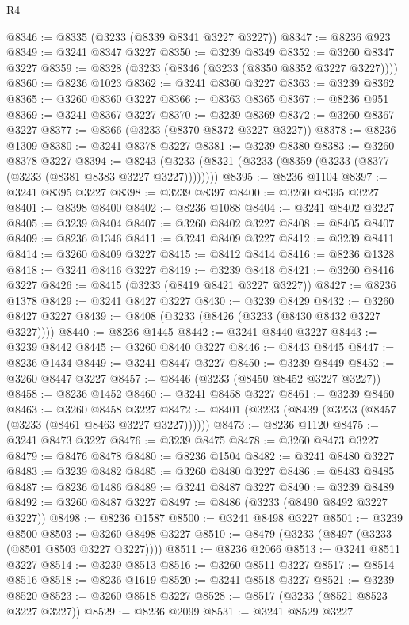 \begin{lexlean}{R4}
\begin{coremodule}
@8346 := @8335 (@3233 (@8339 @8341 @3227 @3227))
@8347 := @8236 @923
@8349 := @3241 @8347 @3227
@8350 := @3239 @8349
@8352 := @3260 @8347 @3227
@8359 := @8328 (@3233 (@8346 (@3233 (@8350 @8352 @3227 @3227))))
@8360 := @8236 @1023
@8362 := @3241 @8360 @3227
@8363 := @3239 @8362
@8365 := @3260 @8360 @3227
@8366 := @8363 @8365
@8367 := @8236 @951
@8369 := @3241 @8367 @3227
@8370 := @3239 @8369
@8372 := @3260 @8367 @3227
@8377 := @8366 (@3233 (@8370 @8372 @3227 @3227))
@8378 := @8236 @1309
@8380 := @3241 @8378 @3227
@8381 := @3239 @8380
@8383 := @3260 @8378 @3227
@8394 := @8243 (@3233 (@8321 (@3233 (@8359 (@3233 (@8377 (@3233 (@8381 @8383 @3227 @3227))))))))
@8395 := @8236 @1104
@8397 := @3241 @8395 @3227
@8398 := @3239 @8397
@8400 := @3260 @8395 @3227
@8401 := @8398 @8400
@8402 := @8236 @1088
@8404 := @3241 @8402 @3227
@8405 := @3239 @8404
@8407 := @3260 @8402 @3227
@8408 := @8405 @8407
@8409 := @8236 @1346
@8411 := @3241 @8409 @3227
@8412 := @3239 @8411
@8414 := @3260 @8409 @3227
@8415 := @8412 @8414
@8416 := @8236 @1328
@8418 := @3241 @8416 @3227
@8419 := @3239 @8418
@8421 := @3260 @8416 @3227
@8426 := @8415 (@3233 (@8419 @8421 @3227 @3227))
@8427 := @8236 @1378
@8429 := @3241 @8427 @3227
@8430 := @3239 @8429
@8432 := @3260 @8427 @3227
@8439 := @8408 (@3233 (@8426 (@3233 (@8430 @8432 @3227 @3227))))
@8440 := @8236 @1445
@8442 := @3241 @8440 @3227
@8443 := @3239 @8442
@8445 := @3260 @8440 @3227
@8446 := @8443 @8445
@8447 := @8236 @1434
@8449 := @3241 @8447 @3227
@8450 := @3239 @8449
@8452 := @3260 @8447 @3227
@8457 := @8446 (@3233 (@8450 @8452 @3227 @3227))
@8458 := @8236 @1452
@8460 := @3241 @8458 @3227
@8461 := @3239 @8460
@8463 := @3260 @8458 @3227
@8472 := @8401 (@3233 (@8439 (@3233 (@8457 (@3233 (@8461 @8463 @3227 @3227))))))
@8473 := @8236 @1120
@8475 := @3241 @8473 @3227
@8476 := @3239 @8475
@8478 := @3260 @8473 @3227
@8479 := @8476 @8478
@8480 := @8236 @1504
@8482 := @3241 @8480 @3227
@8483 := @3239 @8482
@8485 := @3260 @8480 @3227
@8486 := @8483 @8485
@8487 := @8236 @1486
@8489 := @3241 @8487 @3227
@8490 := @3239 @8489
@8492 := @3260 @8487 @3227
@8497 := @8486 (@3233 (@8490 @8492 @3227 @3227))
@8498 := @8236 @1587
@8500 := @3241 @8498 @3227
@8501 := @3239 @8500
@8503 := @3260 @8498 @3227
@8510 := @8479 (@3233 (@8497 (@3233 (@8501 @8503 @3227 @3227))))
@8511 := @8236 @2066
@8513 := @3241 @8511 @3227
@8514 := @3239 @8513
@8516 := @3260 @8511 @3227
@8517 := @8514 @8516
@8518 := @8236 @1619
@8520 := @3241 @8518 @3227
@8521 := @3239 @8520
@8523 := @3260 @8518 @3227
@8528 := @8517 (@3233 (@8521 @8523 @3227 @3227))
@8529 := @8236 @2099
@8531 := @3241 @8529 @3227

\end{coremodule}
\end{lexlean}
